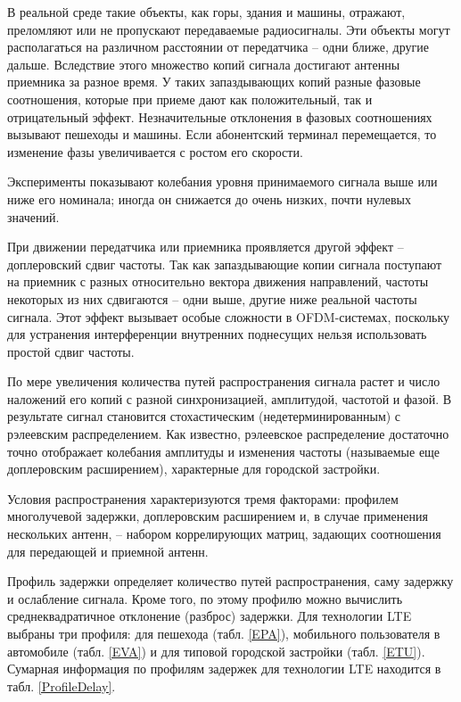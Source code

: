 В реальной среде такие объекты, как горы, здания и машины, отражают, преломляют или не пропускают передаваемые радиосигналы. Эти объекты могут располагаться на различном расстоянии от передатчика – одни ближе, другие дальше. Вследствие этого множество копий сигнала достигают антенны приемника за разное время. У таких запаздывающих копий разные фазовые соотношения, которые при приеме дают как положительный, так и отрицательный эффект. Незначительные отклонения в фазовых соотношениях вызывают пешеходы и машины. Если абонентский терминал перемещается, то изменение фазы увеличивается с ростом его скорости.

Эксперименты показывают колебания уровня принимаемого сигнала выше или ниже его номинала; иногда он снижается до очень низких, почти нулевых значений.

При движении передатчика или приемника проявляется другой эффект – доплеровский сдвиг частоты. Так как запаздывающие копии сигнала поступают на приемник с разных относительно вектора движения направлений, частоты некоторых из них сдвигаются – одни выше, другие ниже реальной частоты сигнала. Этот эффект вызывает особые сложности в OFDM-системах, поскольку для устранения интерференции внутренних поднесущих нельзя использовать простой сдвиг частоты.

По мере увеличения количества путей распространения сигнала растет и число наложений его копий с разной синхронизацией, амплитудой, частотой и фазой. В результате сигнал становится стохастическим (недетерминированным) с рэлеевским распределением. Как известно, рэлеевское распределение достаточно точно отображает колебания амплитуды и изменения частоты (называемые еще доплеровским расширением), характерные для городской застройки.

Условия распространения характеризуются тремя факторами: профилем многолучевой задержки, доплеровским расширением и, в случае применения нескольких антенн, – набором коррелирующих матриц, задающих соотношения для передающей и приемной антенн.

Профиль задержки определяет количество путей распространения, саму задержку и ослабление сигнала. Кроме того, по этому профилю можно вычислить среднеквадратичное отклонение (разброс) задержки. Для технологии LTE выбраны три профиля: для пешехода (табл. \ref{EPA}), мобильного пользователя в автомобиле (табл. \ref{EVA}) и для типовой городской застройки (табл. \ref{ETU}). Сумарная информация по профилям задержек для технологии LTE находится в табл. \ref{ProfileDelay}.



